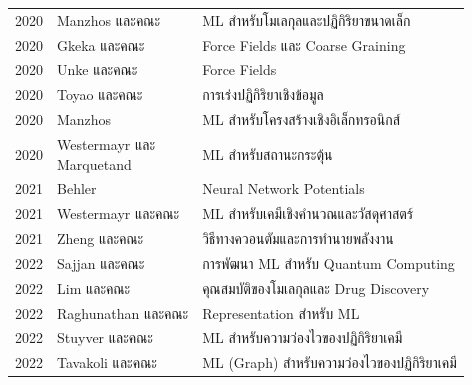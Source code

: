 \begin{table}[H]
\begin{tabular}{cll}
        2020                  & Manzhos และคณะ\autocite{manzhos2021}                              & ML สำหรับโมเลกุลและปฏิกิริยาขนาดเล็ก           \\
        2020                  & Gkeka และคณะ\autocite{gkeka2020}                                  & Force Fields และ Coarse Graining        \\
        2020                  & Unke และคณะ\autocite{unke2021}                                    & Force Fields                            \\
        2020                  & Toyao และคณะ\autocite{toyao2020}                                  & การเร่งปฏิกิริยาเชิงข้อมูล                     \\
        2020                  & Manzhos\autocite{manzhos2020}                                     & ML สำหรับโครงสร้างเชิงอิเล็กทรอนิกส์            \\
        2020                  & \makecell[tl]{Westermayr และ \\ Marquetand\autocite{westermayr2021a}} &ML สำหรับสถานะกระตุ้น \\
        2021                  & Behler\autocite{behler2021}                                       & Neural Network Potentials               \\
        2021                  & Westermayr และคณะ\autocite{westermayr2021b}                       & ML สำหรับเคมีเชิงคำนวณและวัสดุศาสตร์            \\
        2021                  & Zheng และคณะ\autocite{zheng2021}                                  & วิธีทางควอนตัมและการทำนายพลังงาน             \\
        2022                  & Sajjan และคณะ\autocite{sajjan2022}                                & การพัฒนา ML สำหรับ Quantum Computing       \\
        2022                  & Lim และคณะ\autocite{lim2022}                                      & คุณสมบัติของโมเลกุลและ Drug Discovery       \\
        2022                  & Raghunathan และคณะ\autocite{raghunathan2022}                      & Representation สำหรับ ML                  \\
        2022                  & Stuyver และคณะ\autocite{stuyver2022}                              & ML สำหรับความว่องไวของปฏิกิริยาเคมี            \\
        2022                  & Tavakoli และคณะ\autocite{tavakoli2022}                            & ML (Graph) สำหรับความว่องไวของปฏิกิริยาเคมี    \\

\end{tabular}
\end{table}
